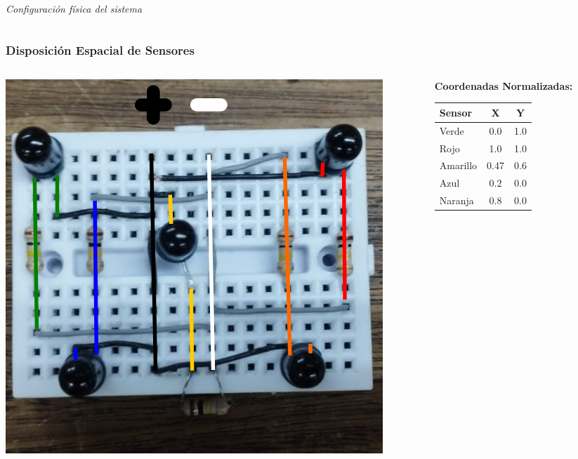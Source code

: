 \documentclass[xcolor=dvipsnames]{beamer}
\begin{document}
\begin{frame}
\begin{columns}
\begin{column}{0.5\textwidth}
\begin{center}
                \vspace{0.3cm}
                \textit{Configuración física del sistema}
            \end{center}
        \end{column}
    \end{columns}
\end{frame}

\begin{frame}
    \frametitle{Disposición Espacial de Sensores}
    \begin{columns}
        \begin{column}{0.6\textwidth}
            \begin{center}
                \includegraphics[width=\textwidth]{../assets/diagrama.png}
            \end{center}
        \end{column}
        \begin{column}{0.4\textwidth}
            \textbf{Coordenadas Normalizadas:}
            \begin{table}[h]
                \footnotesize
                \begin{tabular}{lcc}
                    \toprule
                    \textbf{Sensor} & \textbf{X} & \textbf{Y} \\
                    \midrule
                    Verde   & 0.0  & 1.0 \\
                    Rojo    & 1.0  & 1.0 \\
                    Amarillo& 0.47 & 0.6 \\
                    Azul    & 0.2  & 0.0 \\
                    Naranja & 0.8  & 0.0 \\
                    \bottomrule
                \end{tabular}
            \end{table}
            

\end{column}
\end{columns}
\end{frame}
\end{document}

